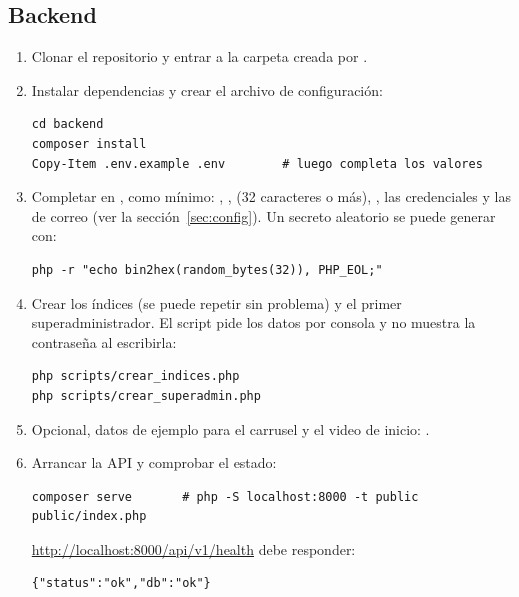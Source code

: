 \documentclass[11pt,a4paper]{article}
\begin{document}
\subsection{Backend}

\begin{enumerate}
  \item Clonar el repositorio y entrar a la carpeta creada por .
  \item Instalar dependencias y crear el archivo de configuraci\'on:
\begin{lstlisting}[style=powershell]
cd backend
composer install
Copy-Item .env.example .env        # luego completa los valores
\end{lstlisting}
  \item Completar en , como m\'inimo: , ,  (32
    caracteres o m\'as), , las credenciales  y las de correo 
    (ver la secci\'on~\ref{sec:config}). Un secreto aleatorio se puede generar con:
\begin{lstlisting}[style=powershell]
php -r "echo bin2hex(random_bytes(32)), PHP_EOL;"
\end{lstlisting}
  \item Crear los \'indices (se puede repetir sin problema) y el primer superadministrador. El script pide los datos por
    consola y no muestra la contrase\~na al escribirla:
\begin{lstlisting}[style=powershell]
php scripts/crear_indices.php
php scripts/crear_superadmin.php
\end{lstlisting}
  \item Opcional, datos de ejemplo para el carrusel y el video de inicio: .
  \item Arrancar la API y comprobar el estado:
\begin{lstlisting}[style=powershell]
composer serve       # php -S localhost:8000 -t public public/index.php
\end{lstlisting}
    \url{http://localhost:8000/api/v1/health} debe responder:
\begin{lstlisting}[style=json]
{"status":"ok","db":"ok"}
\end{lstlisting}
\end{enumerate}

\end{document}
